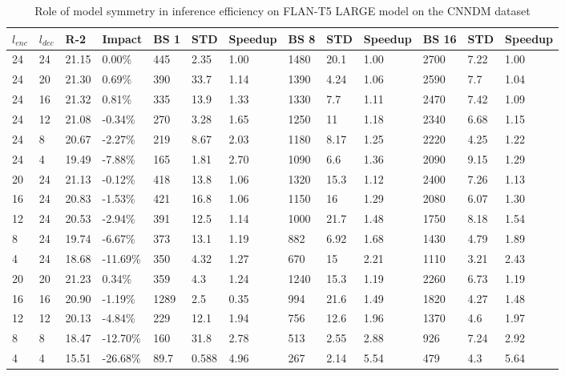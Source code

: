 \begin{table*}[!ht]
    \centering
    \caption{Role of model symmetry in inference efficiency on FLAN-T5 LARGE model on the CNNDM dataset}
    \small
    \begin{tabular}{|l|l|l|l|l|l|l|l|l|l|l|l|l|}
    \hline
         $l_{enc}$ & $l_{dec}$ & R-2 & Impact & BS 1 & STD & Speedup & BS 8 & STD  & Speedup & BS 16 & STD & Speedup \\ \hline
         24 & 24 & 21.15 & 0.00\% & 445 & 2.35 & 1.00 & 1480 & 20.1 & 1.00 & 2700 & 7.22 & 1.00 \\ \hline
        24 & 20 & 21.30 & 0.69\% & 390 & 33.7 & 1.14 & 1390 & 4.24 & 1.06 & 2590 & 7.7 & 1.04 \\ \hline
        24 & 16 & 21.32 & 0.81\% & 335 & 13.9 & 1.33 & 1330 & 7.7 & 1.11 & 2470 & 7.42 & 1.09 \\ \hline
        24 & 12 & 21.08 & -0.34\% & 270 & 3.28 & 1.65 & 1250 & 11 & 1.18 & 2340 & 6.68 & 1.15 \\ \hline
        24 & 8 & 20.67 & -2.27\% & 219 & 8.67 & 2.03 & 1180 & 8.17 & 1.25 & 2220 & 4.25 & 1.22 \\ \hline
        24 & 4 & 19.49 & -7.88\% & 165 & 1.81 & 2.70 & 1090 & 6.6 & 1.36 & 2090 & 9.15 & 1.29 \\ \hline
        20 & 24 & 21.13 & -0.12\% & 418 & 13.8 & 1.06 & 1320 & 15.3 & 1.12 & 2400 & 7.26 & 1.13 \\ \hline
        16 & 24 & 20.83 & -1.53\% & 421 & 16.8 & 1.06 & 1150 & 16 & 1.29 & 2080 & 6.07 & 1.30 \\ \hline
        12 & 24 & 20.53 & -2.94\% & 391 & 12.5 & 1.14 & 1000 & 21.7 & 1.48 & 1750 & 8.18 & 1.54 \\ \hline
        8 & 24 & 19.74 & -6.67\% & 373 & 13.1 & 1.19 & 882 & 6.92 & 1.68 & 1430 & 4.79 & 1.89 \\ \hline
        4 & 24 & 18.68 & -11.69\% & 350 & 4.32 & 1.27 & 670 & 15 & 2.21 & 1110 & 3.21 & 2.43 \\ \hline
        20 & 20 & 21.23 & 0.34\% & 359 & 4.3 & 1.24 & 1240 & 15.3 & 1.19 & 2260 & 6.73 & 1.19 \\ \hline
        16 & 16 & 20.90 & -1.19\% & 1289 & 2.5 & 0.35 & 994 & 21.6 & 1.49 & 1820 & 4.27 & 1.48 \\ \hline
        12 & 12 & 20.13 & -4.84\% & 229 & 12.1 & 1.94 & 756 & 12.6 & 1.96 & 1370 & 4.6 & 1.97 \\ \hline
        8 & 8 & 18.47 & -12.70\% & 160 & 31.8 & 2.78 & 513 & 2.55 & 2.88 & 926 & 7.24 & 2.92 \\ \hline
        4 & 4 & 15.51 & -26.68\% & 89.7 & 0.588 & 4.96 & 267 & 2.14 & 5.54 & 479 & 4.3 & 5.64 \\ \hline
    \end{tabular}
    \label{tab:cnndm-asym-inference-large}
\end{table*}

